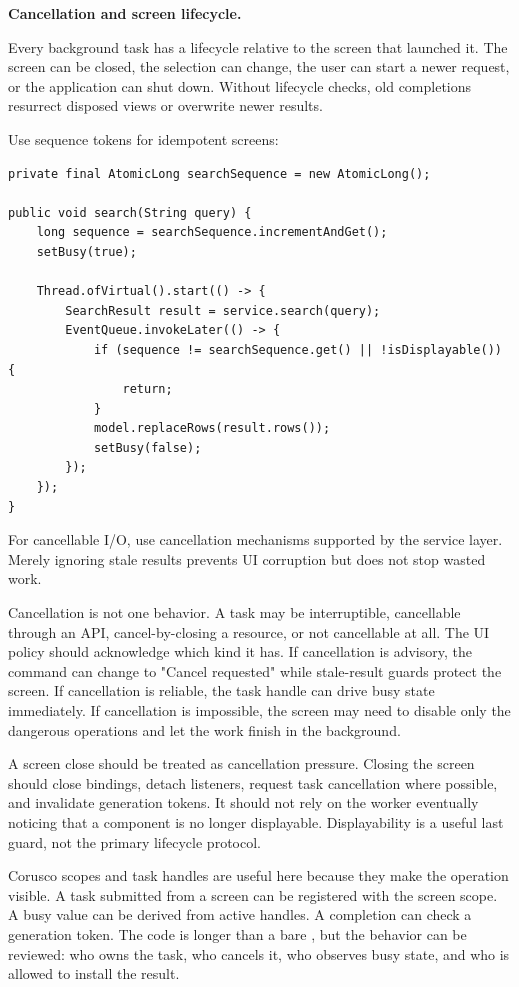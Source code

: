 \textbf{Cancellation and screen lifecycle.}

Every background task has a lifecycle relative to the screen that launched it. The screen can be closed, the selection can change, the user can start a newer request, or the application can shut down. Without lifecycle checks, old completions resurrect disposed views or overwrite newer results.

Use sequence tokens for idempotent screens:

\begin{lstlisting}[caption={Rejecting stale completions with a sequence token.}]
private final AtomicLong searchSequence = new AtomicLong();

public void search(String query) {
    long sequence = searchSequence.incrementAndGet();
    setBusy(true);

    Thread.ofVirtual().start(() -> {
        SearchResult result = service.search(query);
        EventQueue.invokeLater(() -> {
            if (sequence != searchSequence.get() || !isDisplayable()) {
                return;
            }
            model.replaceRows(result.rows());
            setBusy(false);
        });
    });
}
\end{lstlisting}

For cancellable I/O, use cancellation mechanisms supported by the service layer. Merely ignoring stale results prevents UI corruption but does not stop wasted work.

Cancellation is not one behavior. A task may be interruptible, cancellable through an API, cancel-by-closing a resource, or not cancellable at all. The UI policy should acknowledge which kind it has. If cancellation is advisory, the command can change to "Cancel requested" while stale-result guards protect the screen. If cancellation is reliable, the task handle can drive busy state immediately. If cancellation is impossible, the screen may need to disable only the dangerous operations and let the work finish in the background.

A screen close should be treated as cancellation pressure. Closing the screen should close bindings, detach listeners, request task cancellation where possible, and invalidate generation tokens. It should not rely on the worker eventually noticing that a component is no longer displayable. Displayability is a useful last guard, not the primary lifecycle protocol.

Corusco scopes and task handles are useful here because they make the operation visible. A task submitted from a screen can be registered with the screen scope. A busy value can be derived from active handles. A completion can check a generation token. The code is longer than a bare , but the behavior can be reviewed: who owns the task, who cancels it, who observes busy state, and who is allowed to install the result.


